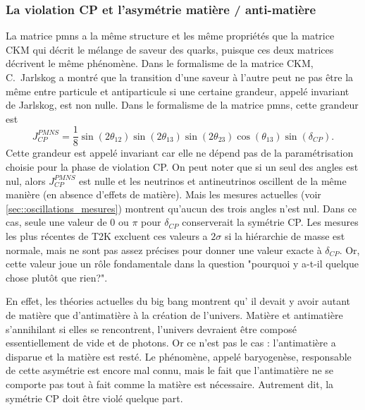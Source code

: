         \subsubsection{La violation CP et l'asymétrie matière / anti-matière}\label{sec::CP_violation}
            La matrice \gls{pmns} a la même structure et les même propriétés que la matrice CKM qui décrit le mélange de saveur des quarks, puisque ces deux matrices décrivent le même phénomène. Dans le formalisme de la matrice CKM, C.~Jarlskog a montré que la transition d'une saveur à l'autre peut ne pas être la même entre particule et antiparticule si une certaine grandeur, appelé invariant de Jarlskog, est non nulle\cite{Jarlskog1985}. Dans le formalisme de la matrice \gls{pmns}, cette grandeur est
            \begin{equation}
                J_{CP}^{PMNS}=\frac{1}{8}\sin(2\theta_{12})\sin(2\theta_{13})\sin(2\theta_{23})\cos(\theta_{13})\sin(\delta_{CP}).
            \end{equation}
            Cette grandeur est appelé invariant car elle ne dépend pas de la paramétrisation choisie pour la phase de violation CP. On peut noter que si un seul des angles est nul, alors $J_{CP}^{PMNS}$ est nulle et les neutrinos et antineutrinos oscillent de la même manière (en absence d'effets de matière). Mais les mesures actuelles (voir \autoref{sec::oscillations_mesures}) montrent qu'aucun des trois angles n'est nul. Dans ce cas, seule une valeur de $0$ ou $\pi$ pour $\delta_{CP}$ conserverait la symétrie CP. Les mesures les plus récentes de T2K excluent ces valeurs a $2\sigma$\cite{Abe2018} si la hiérarchie de masse est normale, mais ne sont pas assez précises pour donner une valeur exacte à $\delta_{CP}$. Or, cette valeur joue un rôle fondamentale dans la question "pourquoi y a-t-il quelque chose plutôt que rien?".
            
            En effet, les théories actuelles du big bang\cite{ref needed} montrent qu' il devait y avoir autant de matière que d'antimatière à la création de l'univers. Matière et antimatière s'annihilant si elles se rencontrent, l'univers devraient être composé essentiellement de vide et de photons. Or ce n'est pas le cas : l'antimatière a disparue et la matière est resté. Le phénomène, appelé baryogenèse, responsable de cette asymétrie est encore mal connu, mais le fait que l'antimatière ne se comporte pas tout à fait comme la matière est nécessaire\cite{Sakharov1991}. Autrement dit, la symétrie CP doit être violé quelque part.
            
